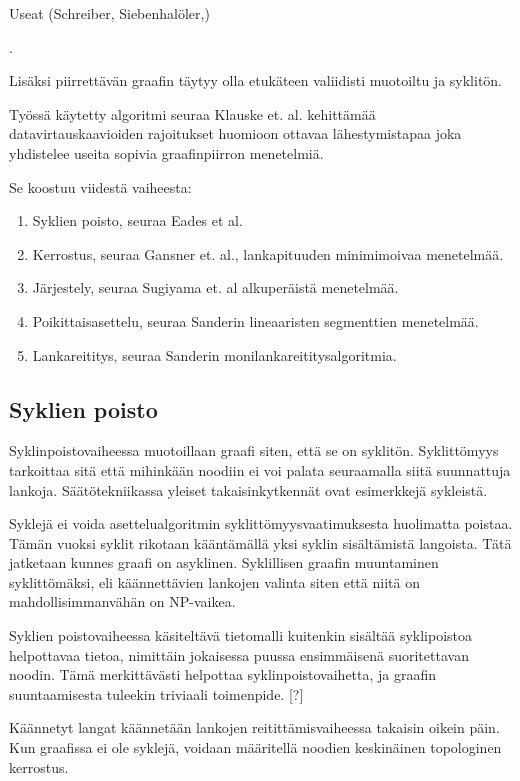 \documentclass[finnish,12pt]{article}
\begin{document}
Useat (Schreiber, Siebenhalöler,)

\cite{RefWorks:28}.

Lisäksi piirrettävän graafin täytyy olla etukäteen valiidisti muotoiltu ja syklitön.

Työssä käytetty algoritmi seuraa Klauske et. al. kehittämää  datavirtauskaavioiden rajoitukset huomioon ottavaa lähestymistapaa \cite{RefWorks:50} joka yhdistelee useita sopivia graafinpiirron menetelmiä.

Se koostuu viidestä vaiheesta:
\begin{enumerate}
  \item Syklien poisto, seuraa Eades et al.\cite{RefWorks:48}
  \item Kerrostus, seuraa Gansner et. al., lankapituuden minimimoivaa menetelmää. \cite{RefWorks:28}
  \item Järjestely, seuraa Sugiyama et. al alkuperäistä menetelmää. \cite{RefWorks:9}
  \item Poikittaisasettelu, seuraa Sanderin lineaaristen segmenttien menetelmää. \cite{RefWorks:49}
  \item Lankareititys, seuraa Sanderin monilankareititysalgoritmia. \cite{RefWorks:17}
\end{enumerate}

		\subsection{Syklien poisto}

Syklinpoistovaiheessa muotoillaan graafi siten, että se on syklitön.
Syklittömyys tarkoittaa sitä että mihinkään noodiin ei voi palata seuraamalla siitä suunnattuja lankoja.
Säätötekniikassa yleiset takaisinkytkennät ovat esimerkkejä sykleistä.

Syklejä ei voida asettelualgoritmin syklittömyysvaatimuksesta huolimatta poistaa.
Tämän vuoksi syklit rikotaan kääntämällä yksi syklin sisältämistä langoista.
Tätä jatketaan kunnes graafi on asyklinen.
Syklillisen graafin muuntaminen syklittömäksi, eli käännettävien lankojen valinta siten että niitä on mahdollisimmanvähän on NP-vaikea.

Syklien poistovaiheessa käsiteltävä tietomalli kuitenkin sisältää syklipoistoa helpottavaa tietoa, nimittäin jokaisessa puussa ensimmäisenä suoritettavan noodin. Tämä merkittävästi helpottaa syklinpoistovaihetta, ja graafin suuntaamisesta tuleekin triviaali toimenpide. [?]

Käännetyt langat käännetään lankojen reitittämisvaiheessa takaisin oikein päin.
Kun graafissa ei ole syklejä, voidaan määritellä noodien keskinäinen topologinen kerrostus.
\end{document}
